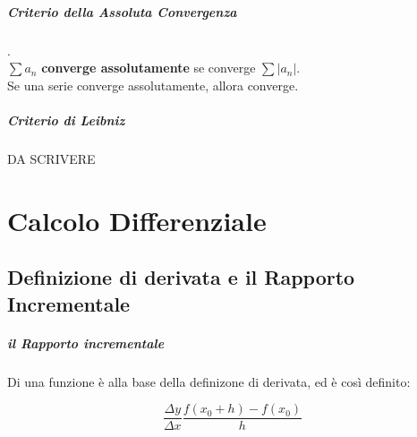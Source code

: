 \documentclass[12pt, a4paper, openany]{book}
\begin{document}
\paragraph{Criterio della Assoluta Convergenza}.\\
$\sum a_n$ \textbf{converge assolutamente} se converge $\sum |a_n|$.\\
Se una serie converge assolutamente, allora converge.

\paragraph{Criterio di Leibniz}
DA SCRIVERE

\chapter{Calcolo Differenziale}



\section{Definizione di derivata e il Rapporto Incrementale}
\paragraph*{il Rapporto incrementale} Di una funzione è alla base della definizone di derivata, ed è così definito:

\[ 
	\frac{\Delta y}{ \Delta x}\frac{f(x_0+h)-f(x_0)}{h} 
\]
\end{document}
